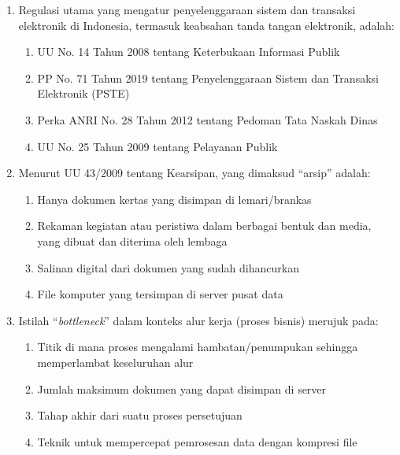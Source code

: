\documentclass[12pt,a4paper]{report}
\begin{document}
\vspace{0.3cm}

\begin{enumerate}[leftmargin=*, itemsep=0.5cm]

\item Regulasi utama yang mengatur penyelenggaraan sistem dan transaksi elektronik di Indonesia, termasuk keabsahan tanda tangan elektronik, adalah:
\begin{enumerate}[label=\Alph*., nosep]
    \item UU No. 14 Tahun 2008 tentang Keterbukaan Informasi Publik
    \item PP No. 71 Tahun 2019 tentang Penyelenggaraan Sistem dan Transaksi Elektronik (PSTE)
    \item Perka ANRI No. 28 Tahun 2012 tentang Pedoman Tata Naskah Dinas
    \item UU No. 25 Tahun 2009 tentang Pelayanan Publik
\end{enumerate}

\item Menurut UU 43/2009 tentang Kearsipan, yang dimaksud ``arsip'' adalah:
\begin{enumerate}[label=\Alph*., nosep]
    \item Hanya dokumen kertas yang disimpan di lemari/brankas
    \item Rekaman kegiatan atau peristiwa dalam berbagai bentuk dan media, yang dibuat dan diterima oleh lembaga
    \item Salinan digital dari dokumen yang sudah dihancurkan
    \item File komputer yang tersimpan di server pusat data
\end{enumerate}

\item Istilah ``\textit{bottleneck}'' dalam konteks alur kerja (proses bisnis) merujuk pada:
\begin{enumerate}[label=\Alph*., nosep]
    \item Titik di mana proses mengalami hambatan/penumpukan sehingga memperlambat keseluruhan alur
    \item Jumlah maksimum dokumen yang dapat disimpan di server
    \item Tahap akhir dari suatu proses persetujuan
    \item Teknik untuk mempercepat pemrosesan data dengan kompresi file
\end{enumerate}


\end{enumerate}
\end{document}
